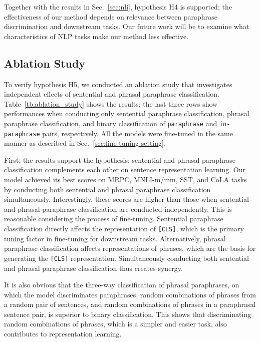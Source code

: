 \documentclass[11pt,a4paper]{article}
\newcommand{\Tref}[1]{Table~\ref{#1}}
\newcommand{\Sref}[1]{Sec.~\ref{#1}}
\begin{document}
Together with the results in \Sref{sec:nli}, hypothesis H4 is supported; the effectiveness of our method depends on relevance between paraphrase discrimination and downstream tasks.  
Our future work will be to examine what characteristics of NLP tasks make our method less effective.


\subsection{Ablation Study}
To verify hypothesis H5, we conducted an ablation study that investigates independent effects of sentential and phrasal paraphrase classification.
\Tref{tb:ablation_study} shows the results; the last three rows show performances when conducting only sentential paraphrase classification, phrasal paraphrase classification, and binary classification of {\tt paraphrase} and {\tt in-paraphrase} pairs, respectively.
All the models were fine-tuned in the same manner as described in \Sref{sec:fine-tuning-setting}. 



First, the results support the hypothesis; sentential and phrasal paraphrase classification complements each other on sentence representation learning. 
Our model achieved its best scores on MRPC, MNLI-m/mm, SST, and CoLA tasks by conducting both sentential and phrasal paraphrase classification simultaneously. 
Interestingly, these scores are higher than those when sentential and phrasal paraphrase classification are conducted independently. 
This is reasonable considering the process of fine-tuning. 
Sentential paraphrase classification directly affects the representation of {\tt [CLS]}, which is the primary tuning factor in fine-tuning for downstream tasks. 
Alternatively, phrasal paraphrase classification affects representations of phrases, which are the basis for generating the {\tt [CLS]} representation. 
Simultaneously conducting both sentential and phrasal paraphrase classification thus creates synergy. 


It is also obvious that the three-way classification of phrasal paraphrases, on which the model discriminates paraphrases, random combinations of phrases from a random pair of sentences, and random combinations of phrases in a paraphrasal sentence pair, is superior to binary classification.  
This shows that discriminating random combinations of phrases, which is a simpler and easier task, also contributes to representation learning.
\end{document}
